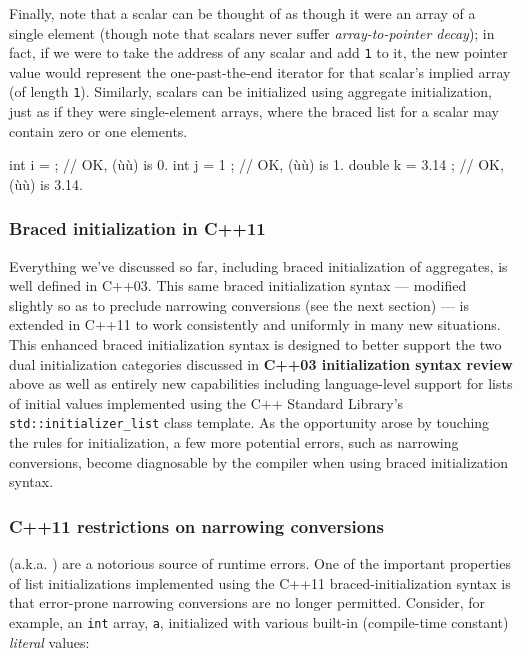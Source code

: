 Finally, note that a scalar can be thought of as though it were an array
of a single element (though note that scalars never suffer
\emph{array-to-pointer decay}); in fact, if we were to take the address
of any scalar and add \lstinline!1! to it, the new pointer value would
represent the one-past-the-end iterator for that scalar's implied array
(of length \lstinline!1!). Similarly, scalars can be initialized using
aggregate initialization, just as if they were single-element arrays,
where the braced list for a scalar may contain zero or one elements.

\begin{emcppslisting}
int    i = { };       // OK, (ù{}ù) is 0.
int    j = { 1 };     // OK, (ù{}ù) is 1.
double k = { 3.14 };  // OK, (ù{}ù) is 3.14.
\end{emcppslisting}
    

\subsubsection[Braced initialization in C++11]{Braced initialization in C++11}\label{braced-initialization-in-c++11}

Everything we've discussed so far, including braced initialization of
aggregates, is well defined in C++03. This same braced initialization
syntax --- modified slightly so as to preclude narrowing conversions
(see the next section) --- is extended in C++11 to work consistently and
uniformly in many new situations. This enhanced braced initialization
syntax is designed to better support the two dual initialization
categories discussed in \textbf{C++03 initialization syntax review}%
 above
as well as entirely new capabilities including language-level support
for lists of initial values implemented using the C++ Standard Library's
\lstinline!std::initializer_list! class template. As the opportunity arose
by touching the rules for initialization, a few more potential errors,
such as narrowing conversions, become diagnosable by the compiler when
using braced initialization syntax.

\subsubsection[C++11 restrictions on narrowing conversions]{C++11 restrictions on narrowing conversions}\label{c++11-restrictions-on-narrowing-conversions}

 (a.k.a. ) are a
notorious source of runtime errors. One of the important properties of
list initializations implemented using the C++11 braced-initialization
syntax is that error-prone narrowing conversions are no longer
permitted. Consider, for example, an \lstinline!int! array, \lstinline!a!,
initialized with various built-in (compile-time constant) \emph{literal}
values:

